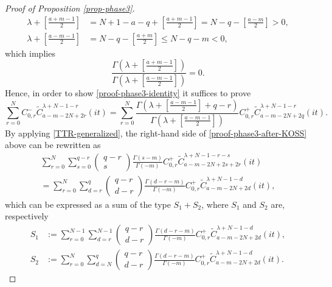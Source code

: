 \documentclass[12pt, pdflatex, a4paper]{article}
\theoremstyle{plain}
\theoremstyle{definition}
\def\Geg{\widetilde{C}}
\begin{document}
\begin{proof}[Proof of Proposition \ref{prop-phase3}]
\begin{align*}
\lambda + \left[\frac{a+m-1}{2}\right] &= N+1-a-q + \left[\frac{a+m-1}{2}\right] = N-q - \left[\frac{a-m}{2}\right] > 0,\\[4pt]
\lambda + \left[\frac{a-m-1}{2}\right] &= N-q - \left[\frac{a+m}{2}\right] \leq N-q-m < 0,
\end{align*}
which implies
\begin{equation*}
\frac{\Gamma\left(\lambda+\left[\frac{a+m-1}{2}\right]\right)}{\Gamma\left(\lambda+\left[\frac{a-m-1}{2}\right]\right)} = 0.
\end{equation*}
Hence, in order to show \eqref{proof-phase3-identity} it suffices to prove
\begin{equation}\label{proof-phase3-after-KOSS}
\sum_{r=0}^{N}C_{0,r}^-\Geg_{a-m-2N+2r}^{\lambda+N-1-r}(it) = \sum_{r=0}^{N}\frac{\Gamma\left(\lambda+\left[\frac{a-m-1}{2}\right] + q-r \right)}{\Gamma\left(\lambda+\left[\frac{a-m-1}{2}\right]\right)}C_{0,r}^+\Geg_{a-m-2N+2q}^{\lambda+N-1-r}(it).
\end{equation}
By applying \eqref{TTR-generalized}, the right-hand side of \eqref{proof-phase3-after-KOSS} above can be rewritten as
\begin{align*}
\sum_{r=0}^N\sum_{s=0}^{q-r}
\begin{pmatrix}
q-r\\
s
\end{pmatrix}
\frac{\Gamma(s-m)}{\Gamma(-m)}C_{0,r}^+\Geg_{a-m-2N+2s+2r}^{\lambda+N-1-r-s}(it)\\
= \sum_{r=0}^N\sum_{d=r}^q
\begin{pmatrix}
q-r\\
d-r
\end{pmatrix}
\frac{\Gamma(d-r-m)}{\Gamma(-m)}C_{0,r}^+\Geg_{a-m-2N+2d}^{\lambda+N-1-d}(it),
\end{align*}
which can be expressed as a sum of the type $S_1 + S_2$, where $S_1$ and $S_2$ are, respectively
\begin{align*}
S_1 &:= \sum_{r=0}^{N-1}\sum_{d=r}^{N-1}
\begin{pmatrix}
q-r\\
d-r
\end{pmatrix}
\frac{\Gamma(d-r-m)}{\Gamma(-m)}C_{0,r}^+\Geg_{a-m-2N+2d}^{\lambda+N-1-d}(it),\\
S_2 &:= \sum_{r=0}^N\sum_{d=N}^q
\begin{pmatrix}
q-r\\
d-r
\end{pmatrix}
\frac{\Gamma(d-r-m)}{\Gamma(-m)}C_{0,r}^+\Geg_{a-m-2N+2d}^{\lambda+N-1-d}(it).

\end{align*}
\end{proof}
\end{document}
